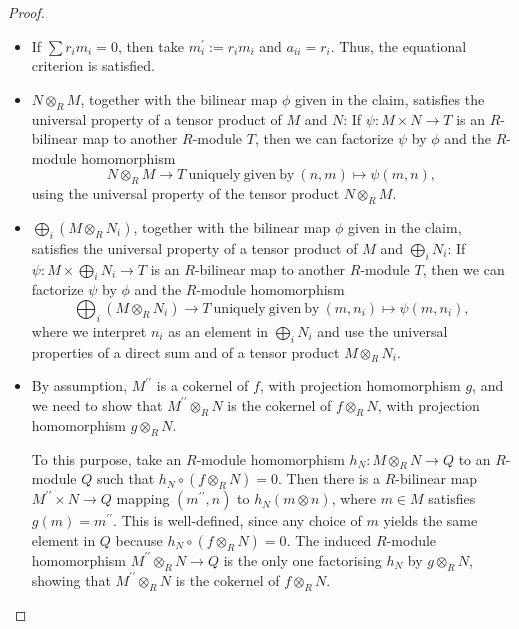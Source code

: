 \documentclass{amsart}
\theoremstyle{plain}
\numberwithin{equation}{section} %
\numberwithin{figure}{section} %
\theoremstyle{plain}
\theoremstyle{plain}
\theoremstyle{plain}
\theoremstyle{plain}
\theoremstyle{plain}
\theoremstyle{plain}
\theoremstyle{remark}
\theoremstyle{remark}
\theoremstyle{remark}
\begin{document}
\begin{proof} 
\begin{itemize}
\item[(a)] If $\sum r_i m_i = 0$, then take $m_i^\prime := r_im_i$ and $a_{ii} = r_i$. Thus, the equational criterion is satisfied.
\item[(b)] $N \otimes_R M$, together with the bilinear map $\phi$ given in the claim, satisfies the universal property of a tensor product of $M$ and $N$: If $\psi : M \times N \rightarrow T$ is an $R$-bilinear map to another $R$-module $T$, then we can factorize $\psi$ by $\phi$ and the $R$-module homomorphism 
\[ N \otimes_R M \rightarrow T\ \mathrm{uniquely\ given\ by\ } (n, m) \mapsto \psi(m,n), \]
using the universal property of the tensor product $N \otimes_R M$.
\item[(c)] $\bigoplus_i (M \otimes_R N_i)$, together with the bilinear map $\phi$ given in the claim, satisfies the universal property of a tensor product of $M$ and $\bigoplus_i N_i$: If $\psi : M \times \bigoplus_i N_i \rightarrow T$ is an $R$-bilinear map to another $R$-module $T$, then we can factorize $\psi$ by $\phi$ and the $R$-module homomorphism 
\[ \bigoplus_i (M \otimes_R N_i) \rightarrow T\ \mathrm{uniquely\ given\ by\ } (m, n_i) \mapsto \psi(m,n_i), \]
where we interpret $n_i$ as an element in $\bigoplus_i N_i$  and use the universal properties of a direct sum and of a tensor product $M \otimes_R N_i$.
\item[(d)] By assumption, $M^{\prime\prime}$ is a cokernel of $f$, with projection homomorphism $g$, and we need to show that $M^{\prime\prime} \otimes_R N$ is the cokernel of $f \otimes_R N$, with projection homomorphism $g \otimes_R N$. 

To this purpose, take an $R$-module homomorphism $h_N : M \otimes_R N \rightarrow Q$ to an $R$-module $Q$ such that $h_N \circ (f \otimes_R N) = 0$. Then there is a $R$-bilinear map $M^{\prime\prime} \times N \rightarrow Q$ mapping $(m^{\prime\prime},n)$ to $h_N(m \otimes n)$, where $m \in M$ satisfies $g(m) = m^{\prime\prime}$. This is well-defined, since any choice of $m$ yields the same element in $Q$ because $h_N \circ (f \otimes_R N) = 0$. The induced $R$-module homomorphism $M^{\prime\prime} \otimes_R N \rightarrow Q$ is the only one factorising $h_N$ by $g \otimes_R N$, showing that $M^{\prime\prime} \otimes_R N$ is the cokernel of $f \otimes_R N$.  
\end{itemize}
\end{proof}
\end{document}
